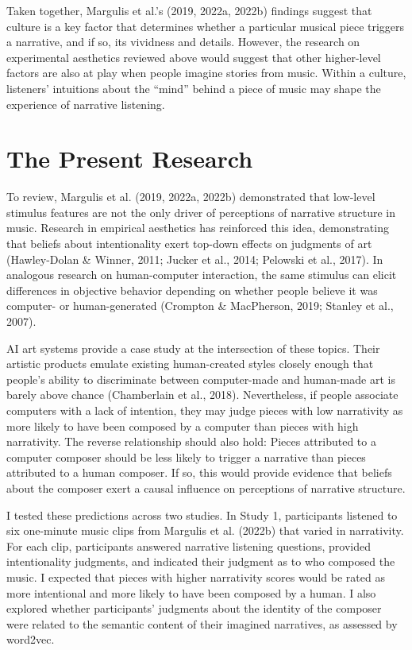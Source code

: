 \documentclass[12pt,twoside]{reedthesis}
\begin{document}
Taken together, Margulis et al.’s (2019, 2022a, 2022b) findings suggest that culture is a key factor that determines whether a particular musical piece triggers a narrative, and if so, its vividness and details. However, the research on experimental aesthetics reviewed above would suggest that other higher-level factors are also at play when people imagine stories from music. Within a culture, listeners’ intuitions about the “mind” behind a piece of music may shape the experience of narrative listening. 

\section{The Present Research}

To review, Margulis et al. (2019, 2022a, 2022b) demonstrated that low-level stimulus features are not the only driver of perceptions of narrative structure in music. Research in empirical aesthetics has reinforced this idea, demonstrating that beliefs about intentionality exert top-down effects on judgments of art (Hawley-Dolan \& Winner, 2011; Jucker et al., 2014; Pelowski et al., 2017). In analogous research on human-computer interaction, the same stimulus can elicit differences in objective behavior depending on whether people believe it was computer- or human-generated (Crompton \& MacPherson, 2019; Stanley et al., 2007).

AI art systems provide a case study at the intersection of these topics. Their artistic products emulate existing human-created styles closely enough that people’s ability to discriminate between computer-made and human-made art is barely above chance (Chamberlain et al., 2018). Nevertheless, if people associate computers with a lack of intention, they may judge pieces with low narrativity as more likely to have been composed by a computer than pieces with high narrativity. The reverse relationship should also hold: Pieces attributed to a computer composer should be less likely to trigger a narrative than pieces attributed to a human composer. If so, this would provide evidence that beliefs about the composer exert a causal influence on perceptions of narrative structure.

I tested these predictions across two studies. In Study 1, participants listened to six one-minute music clips from Margulis et al. (2022b) that varied in narrativity. For each clip, participants answered narrative listening questions, provided intentionality judgments, and indicated their judgment as to who composed the music. I expected that pieces with higher narrativity scores would be rated as more intentional and more likely to have been composed by a human. I also explored whether participants’ judgments about the identity of the composer were related to the semantic content of their imagined narratives, as assessed by word2vec.
\end{document}
